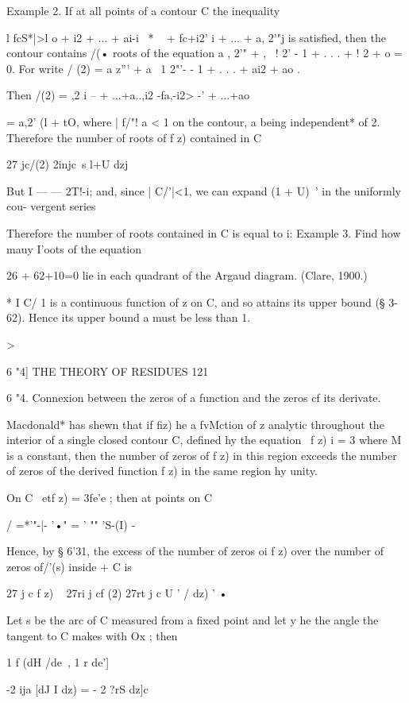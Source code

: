 Example 2. If at all points of a contour C the inequality

l fcS*|>l o + i2 + ... + ai-i~ * ~ + fc+i2' i + ... + a, 2'"j is
satisfied, then the contour contains /(• roots of the equation a , 2'"
+ , \ ! 2' - 1 + . . . + ! 2 + o = 0. For write / (2) = a z''' + a \ 1
2"'- - 1 + . . . + ai2 + ao .

Then /(2) = ,2 i -- + ...+a..,i2 -fa,-i2> -' + ...+ao\

= a,2' (l + tO, where | f/"! a < 1 on the contour, a being
independent* of 2. Therefore the number of roots of f z) contained in
C

27 jc/(2) 2injc\ s l+U dzj

But I — — 2T!-i; and, since | C/'|<1, we can expand (1 + U)~' in the
uniformly cou- vergent series

Therefore the number of roots contained in C is equal to i: Example 3.
Find how mauy I'oots of the equation

26 + 62+10=0 lie in each quadrant of the Argaud diagram. (Clare,
1900.)

* I C/ 1 is a continuous function of z on C, and so attains its upper
bound (§ 3-62). Hence its upper bound a must be less than 1.



>



6 "4] THE THEORY OF RESIDUES 121

6 "4. Connexion between the zeros of a function and the zeros cf its
derivate.

Macdonald* has shewn that if fiz) he a fvMction of z analytic
throughout the interior of a single closed contour C, defined hy the
equation \ f z) i = 3 where M is a constant, then the number of zeros
of f z) in this region exceeds the number of zeros of the derived
function f z) in the same region hy unity.

On C \ etf z) = 3fe'e ; then at points on C

/ =*'"-|- '•" = ' "" 'S-(I) -

Hence, by § 6'31, the excess of the number of zeros oi f z) over the
number of zeros of/'(s) inside + C is

27 j c f z) ~ 27ri j cf (2) 27rt j c U ' / dz) ' •

Let s be the arc of C measured from a fixed point and let y he the
angle the tangent to C makes with Ox ; then

1 f (dH /de\ , 1 r de']

-2 ija [dJ I dz) = - 2 ?rS dz]c

